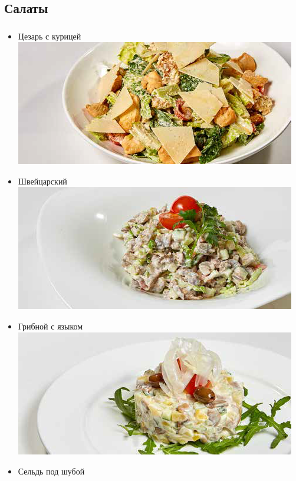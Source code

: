 \documentclass[russian]{beamer}  %
\begin{document}
	\subsection{Салаты}
	\begin{frame}
		\frametitle{\insertsection} 
		\begin{multicols}{2}
			\begin{itemize}
				\item<1->	Цезарь с курицей\\
				\includegraphics[scale=0.45]{salad_1}
				\item<2->	Швейцарский\\
				\includegraphics[scale=0.45]{salad_2}
				\item<3-> 	Грибной с языком\\
				\includegraphics[scale=0.45]{salad_3}
				\item<4-> 	Сельдь под шубой\\

\end{itemize}
\end{multicols}
\end{frame}
\end{document}
